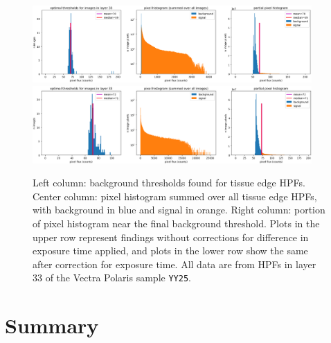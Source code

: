 \documentclass[letterpaper,11pt]{article}
\begin{document}
\begin{figure}[!ht]
\centering
\includegraphics[width=0.95\textwidth]{images/results/thresholding_pre_correction/YY25_layer_33_background_threshold_plots}
\includegraphics[width=0.95\textwidth]{images/results/thresholding_post_correction/YY25_layer_33_background_threshold_plots}
\caption{\footnotesize Left column: background thresholds found for tissue edge HPFs. Center column: pixel histogram summed over all tissue edge HPFs, with background in blue and signal in orange. Right column: portion of pixel histogram near the final background threshold. Plots in the upper row represent findings without corrections for difference in exposure time applied, and plots in the lower row show the same after correction for exposure time. All data are from HPFs in layer 33 of the Vectra Polaris sample \texttt{YY25}.}
\label{fig:background_threshold_impact_polaris_layer_33}
\end{figure}

\clearpage

\section{Summary}
\label{sec:summary}

\clearpage

\end{document}
